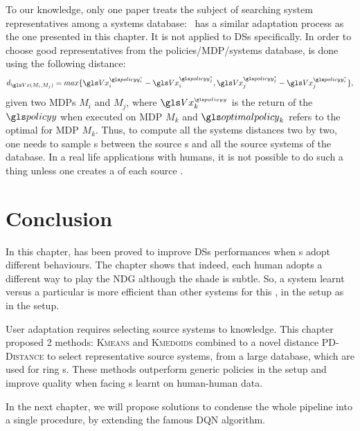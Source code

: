 To our knowledge, only one paper treats the subject of searching system representatives among a systems database:~\parencite{mahmud2013} has a similar adaptation process as the one presented in this chapter. It is not applied to \glspl{DS} specifically. In order to choose good representatives from the policies/MDP/systems database,  is done using the following distance:
\begin{equation*}
    d_{\V(M_i,M_j)} = max\{\V_i^{\policy_i^*}-\V_i^{\policy_j^*},\V_j^{\policy_j^*}-\V_j^{\policy_i^*}\},
\end{equation*}
given two \glspl{MDP} $M_i$ and $M_j$, where $\V_k^{_{\policy}}$ is the return of the  $\policy$ when executed on \gls{MDP} $M_k$ and $\optimalpolicy_k$ refers to the optimal  for \gls{MDP} $M_k$. Thus, to compute all the systems distances two by two, one needs to sample s between the source s and all the source systems of the database. In a real life  applications with humans, it is not possible to do such a thing unless one creates a  of each source .

\section{Conclusion}
%

In this chapter,  has been proved to improve \glspl{DS} performances when s adopt different behaviours. The chapter shows that indeed, each human adopts a different way to play the \gls{NDG} although the shade is subtle. So, a system learnt versus a particular  is more efficient than other systems for this , in the  setup as in the  setup.

User adaptation requires selecting source systems to  knowledge. This chapter proposed 2 methods: \textsc{Kmeans} and \textsc{Kmedoids} combined to a novel distance \textsc{PD-Distance} to select representative source systems, from a large database, which are used for ring  s. These methods outperform generic policies in the  setup and improve  quality when facing s learnt on human-human data.

In the next chapter, we will propose solutions to condense the whole pipeline into a single procedure, by extending the famous \gls{DQN} algorithm.
